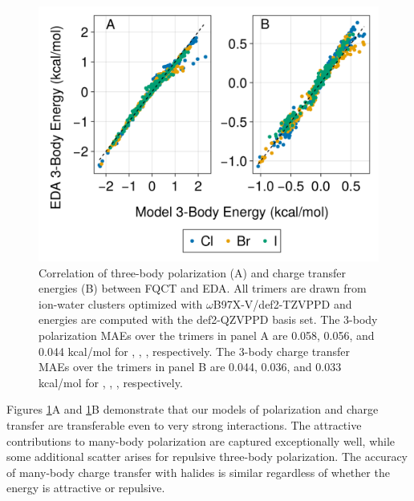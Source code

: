 \documentclass[journal=jacsat,manuscript=article]{achemso}
\begin{document}
\begin{figure}[h]
  \includegraphics*[width=\textwidth]{figures/three_body_pol_and_ct_halides.png}
  \caption{Correlation of three-body polarization (A) and charge transfer energies (B)
  between FQCT and EDA. All trimers are drawn from ion-water clusters optimized
  with $\omega$B97X-V/def2-TZVPPD and energies are computed with the def2-QZVPPD basis set.
  The 3-body polarization MAEs over the trimers in panel A are 0.058, 0.056, and 0.044 kcal/mol
  for , , , respectively. The 3-body charge transfer MAEs over
  the trimers in panel B are 0.044, 0.036, and 0.033 kcal/mol
  for , , , respectively.
}
  \label{fig:halide_3b}
\end{figure}

Figures \ref{fig:halide_3b}A and \ref{fig:halide_3b}B demonstrate that our models
of polarization and charge transfer are transferable even to very strong interactions.
The attractive contributions to many-body polarization are captured exceptionally well,
while some additional scatter arises for repulsive three-body polarization. The accuracy
of many-body charge transfer with halides is similar regardless of whether the energy
is attractive or repulsive. 
\end{document}
